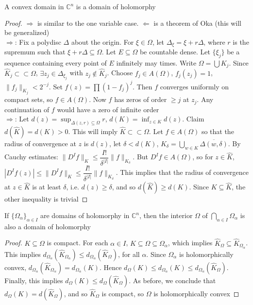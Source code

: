 \documentclass[../main.tex]{subfiles}
\begin{document}
\begin{corollary}
A convex domain in $\mathbb C^n$ is a domain of holomorphy
\end{corollary}

\begin{proof}
$\Rightarrow$ is similar to the one variable case. $\Leftarrow$ is a theorem of Oka (this will be generalized) \\
$\Rightarrow$: Fix a polydisc $\Delta$ about the origin. For $\xi\in\Omega$, let $\Delta_\xi=\xi+r\Delta$, where $r$ is the supremum such that $\xi+r\Delta\subseteq\Omega$. Let $E\subseteq\Omega$ be countable dense. Let $\{\xi_j\}$ be a sequence containing every point of $E$ infinitely may times. Write $\Omega=\bigcup K_j$. Since $\hat K_j\subset\subset\Omega$, $\exists z_j\in\Delta_{\xi_j}$ with $z_j\notin\hat K_j$. Choose $f_j\in A(\Omega)$, $f_j(z_j)=1$, $\|f_j\|_{K_j}<2^{-j}$. Set $f(z)=\prod(1-f_j)^j$. Then $f$ converges uniformly on compact sets, so $f\in A(\Omega)$. Now $f$ has zeros of order $\geq j$ at $z_j$. Any continuation of $f$ would have a zero of infinite order \\
$\Rightarrow$: Let $d(z)=\sup_{\Delta(z,r)\subseteq\Omega}r$, $d(K)=\inf_{z\in K}d(z)$. Claim $d(\hat K)=d(K)>0$. This will imply $\hat K\subset\subset\Omega$. Let $f\in A(\Omega)$ so that the radius of convergence at $z$ is $d(z)$, let $\delta <d(K)$, $K_\delta=\bigcup_{w\in K}\overline{\Delta(w,\delta)}$. By Cauchy estimates: $\|D^If\|_K\leq\dfrac{I!}{\delta^{|I|}}\|f\|_{K_\delta}$. But $D^If\in A(\Omega)$, so for $z\in\hat K$, $|D^If(z)|\leq\|D^If\|_K\leq\dfrac{I!}{\delta^{|I|}}\|f\|_{K_\delta}$. This implies that the radius of convergence at $z\in\hat K$ is at least $\delta$, i.e. $d(z)\geq\delta$, and so $d(\hat K)\geq d(K)$. Since $K\subseteq \hat K$, the other inequality is trivial
\end{proof}

\begin{proposition}
If $\{\Omega_\alpha\}_{\alpha\in I}$ are domains of holomorphy in $\mathbb C^n$, then the interior $\Omega$ of $\bigcap_{\alpha\in I}\Omega_\alpha$ is also a domain of holomorphy
\end{proposition}

\begin{proof}
$K\subseteq\Omega$ is compact. For each $\alpha\in I$, $K\subseteq\Omega\subseteq\Omega_\alpha$, which implies $\hat K_\Omega\subseteq\hat K_{\Omega_\alpha}$. This implies $d_{\Omega_\alpha}(\hat K_{\Omega_\alpha})\leq d_{\Omega_\alpha}(\hat K_\Omega)$, for all $\alpha$. Since $\Omega_\alpha$ is holomorphically convex, $d_{\Omega_\alpha}(\hat K_{\Omega_\alpha})=d_{\Omega_\alpha}(K)$. Hence $d_\Omega(K)\leq d_{\Omega_\alpha}(K)\leq d_{\Omega_\alpha}(\hat K_\Omega)$. Finally, this implies $d_\Omega(K)\leq d_\Omega(\hat K_\Omega)$. As before, we conclude that $d_\Omega(K)=d(\hat K_\Omega)$, and so $\hat K_\Omega$ is compact, so $\Omega$ is holomorphically convex
\end{proof}
\end{document}
